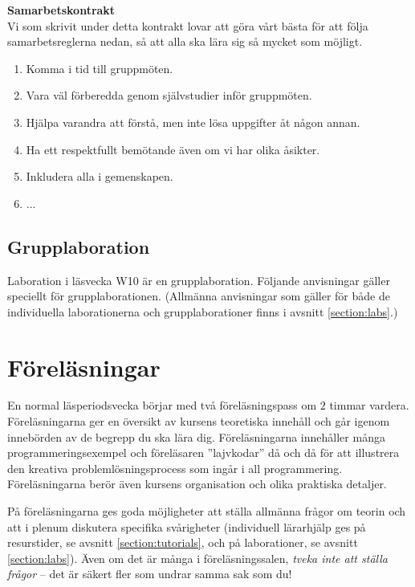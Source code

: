 \begin{oframed}
\noindent\textbf{Samarbetskontrakt}\\
Vi som skrivit under detta kontrakt lovar att göra vårt bästa för att följa samarbetsreglerna nedan, så att alla ska lära sig så mycket som möjligt.
\begin{enumerate}
\item Komma i tid till gruppmöten.
\item Vara väl förberedda genom självstudier inför gruppmöten.
\item Hjälpa varandra att förstå, men inte lösa uppgifter åt någon annan.
\item Ha ett respektfullt bemötande även om vi har olika åsikter.
\item Inkludera alla i gemenskapen.
\item ...
\end{enumerate}
\end{oframed}
\subsection{Grupplaboration}\label{subsection:grouplabs}
Laboration \texttt{\LabWeekTEN} i läsvecka W10 är en grupplaboration.
Följande anvisningar gäller speciellt för grupplaborationen. (Allmänna anvisningar som gäller för både de individuella laborationerna och grupplaborationer finns i avsnitt \ref{section:labs}.)

\begin{enumerate}

\end{enumerate}

\section{Föreläsningar}

En normal läsperiodsvecka börjar med två föreläsningspass om $2$ timmar vardera. Föreläsningarna ger en översikt av kursens teoretiska innehåll och går igenom innebörden av de begrepp du ska lära dig. Föreläsningarna innehåller många programmeringsexempel och föreläsaren ''lajvkodar'' då och då för att illustrera den kreativa problemlösningsprocess som ingår i all programmering. Föreläsningarna berör även kursens organisation och olika praktiska detaljer.

På föreläsningarna ges goda möjligheter att ställa allmänna frågor om teorin och att i plenum diskutera specifika svårigheter (individuell lärarhjälp ges på resurstider, se avsnitt \ref{section:tutorials}, och på laborationer, se avsnitt \ref{section:labs}). Även om det är många i föreläsningssalen, \emph{tveka inte att ställa frågor} -- det är säkert fler som undrar samma sak som du!

